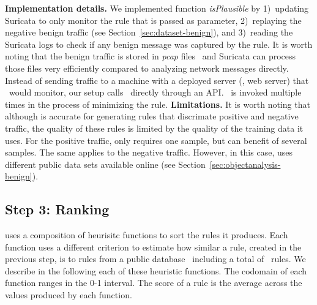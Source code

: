 \documentclass[sigconf,review, anonymous]{acmart}
\begin{document}
\textbf{Implementation details.} We implemented function
\emph{isPlausible} by 1)~updating Suricata to only monitor the rule
that is passed as parameter, 2)~replaying the negative benign traffic (see
Section~\ref{sec:dataset-benign}), and 3)~reading the Suricata logs to
check if any benign message was captured by the rule. It is worth
noting that the benign traffic is stored in \emph{pcap}
files~\cite{pcap} and Suricata can process those files very
efficiently compared to analyzing network messages directly. Instead
of sending traffic to a machine with a deployed server (\eg{}, web
server) that \suri\ would monitor, our setup calls \suri\ directly
through an API. \suri\ is invoked multiple times in the process of
minimizing the rule.  \textbf{Limitations.} It is worth noting that
although \tname{} is accurate for generating rules that discrimate
positive and negative traffic, the quality of these rules is limited
by the quality of the training data it uses. For the positive traffic,
\tname{} only requires one sample, but can benefit of several
samples. The same
applies to the negative traffic. However, in this case, \tname{} uses
different public data sets available online (see
Section~\ref{sec:objectanalysis-benign}).

\subsection{Step 3: Ranking}
\label{sec:ranking}



\tname{} uses a composition of heurisitc functions to sort the rules
it produces. Each function uses a different criterion to estimate how
similar a rule, created in the previous step, is to rules from a
public database~\cite{emerging-threats-open} including a total of
\numrulessuri\ rules. We describe in the following each of these
heuristic functions. The codomain of each function ranges in the 0-1
interval. The score of a rule is the average across the values
produced by each function.

\end{document}
